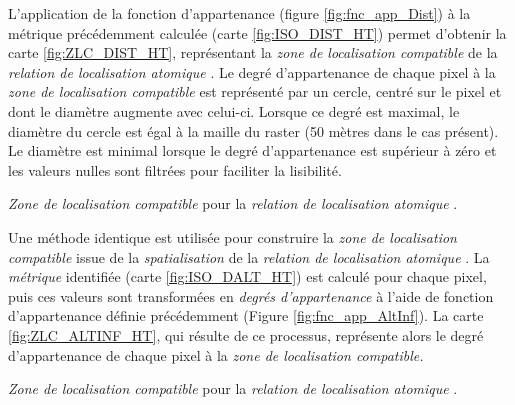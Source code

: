 L’application de la fonction d'appartenance (figure
\ref{fig:fnc_app_Dist}) à la métrique précédemment calculée (carte
\ref{fig:ISO_DIST_HT}) permet d'obtenir la carte
\ref{fig:ZLC_DIST_HT}, représentant la \emph{zone de localisation
  compatible} de la \emph{relation de localisation atomique}
.
Le degré d'appartenance de chaque pixel à la \emph{zone de
  localisation compatible} est représenté par un cercle, centré sur le
pixel et dont le diamètre augmente avec celui-ci. Lorsque ce degré est
maximal, le diamètre du cercle est égal à la maille du raster (50
mètres dans le cas présent). Le diamètre est minimal lorsque le degré
d'appartenance est supérieur à zéro et les valeurs nulles sont
filtrées pour faciliter la lisibilité.

\begin{carte}
  \centering
  
  \caption{\emph{Zone de localisation compatible} pour la
    \emph{relation de localisation atomique}
    \protect{}.}
  \label{fig:ZLC_DIST_HT}
\end{carte}

Une méthode identique est utilisée pour construire la \emph{zone de
  localisation compatible} issue de la \emph{spatialisation} de la
\emph{relation de localisation atomique}
. La
\emph{métrique} identifiée (carte \ref{fig:ISO_DALT_HT}) est calculé
pour chaque pixel, puis ces valeurs sont transformées en \emph{degrés
  d'appartenance} à l'aide de fonction d'appartenance définie
précédemment (Figure \ref{fig:fnc_app_AltInf}). La carte
\ref{fig:ZLC_ALTINF_HT}, qui résulte de ce processus, représente alors
le degré d'appartenance de chaque pixel à la \emph{zone de
  localisation compatible.}

\begin{carte}
  \centering
  
  \caption{\emph{Zone de localisation compatible} pour la
    \emph{relation de localisation atomique}
    \protect{}.}
  \label{fig:ZLC_ALTINF_HT}
\end{carte}

